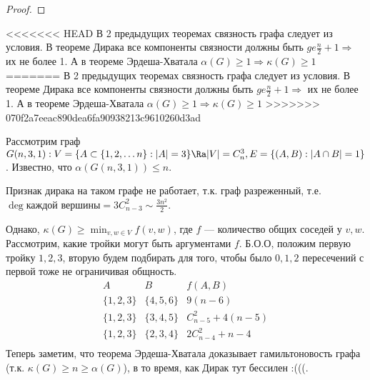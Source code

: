 \begin{proof}
\end{proof}

\begin{note}
<<<<<<< HEAD
В 2 предыдущих теоремах связность графа следует из условия. В теореме Дирака все компоненты связности должны быть \(ge \frac{n}{2} + 1 \Longrightarrow \) их не более 1. А в теореме Эрдеша-Хватала \(\alpha(G) \ge 1 \Longrightarrow \kappa(G) \ge 1\)
=======
    В 2 предыдущих теоремах связность графа следует из условия. В теореме Дирака все компоненты связности должны быть \(ge \frac{n}{2} + 1 \Longrightarrow \) их не более 1. А в теореме Эрдеша-Хватала \(\alpha(G) \ge 1 \Longrightarrow \kappa(G) \ge 1\)
>>>>>>> 070f2a7eeac890dea6fa90938213c9610260d3ad
\end{note}

\begin{example}
    Рассмотрим граф \(G(n, 3, 1): V = \{A \subset \{1, 2, \dots n\}: |A| = 3\} \Ra |V| = C_n^3, E = \{(A, B): |A \cap B| = 1\}\). Известно, что \(\alpha(G(n, 3, 1)) \le n\).

    Признак дирака на таком графе не работает, т.к. граф разреженный, т.е. \(\deg \text{каждой вершины} = 3C_{n - 3}^2 \sim \frac{3n^2}{2}\).

    Однако, \(\kappa(G) \ge \min_{v, w \in V} f(v, w)\), где \(f\) --- количество общих соседей у \(v, w\). Рассмотрим, какие тройки могут быть аргументами \(f\). Б.О.О, положим первую тройку \(1, 2, 3\), вторую будем подбирать для того, чтобы было \(0, 1, 2\) пересечений с первой тоже не ограничивая общность.
    \[\begin{array}{c|c|c}
        A & B & f(A, B) \\
        \hline
        \{1, 2, 3\} & \{4, 5, 6\} & 9(n - 6) \\ 
        \{1, 2, 3\} & \{3, 4, 5\} & C_{n - 5}^2 + 4(n - 5) \\ 
        \{1, 2, 3\} & \{2, 3, 4\} & 2C_{n - 4}^2 + n - 4 \\ 
    \end{array}\]
    Теперь заметим, что теорема Эрдеша-Хватала доказывает гамильтоновость графа (т.к. \(\kappa(G) \ge n \ge \alpha(G)\)), в то время, как Дирак тут бессилен :(((.
\end{example}

